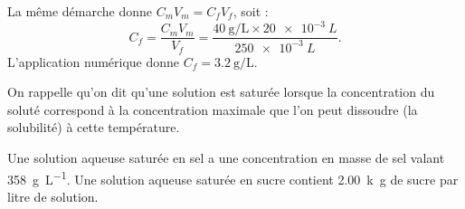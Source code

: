 
\begin{corrige}
La même démarche donne $C_mV_m=C_fV_f$, soit : \vspace{-1mm}
\[
C_f=\frac{C_mV_m}{V_f}=\frac{\SI{40}{\gram\per\liter}\times\SI{20e-3}{L}}{\SI{250e-3}{L}}.
\]
L'application numérique donne $C_f=\SI{3,2}{\gram\per\liter}$.
\end{corrige}


\finEntrainement


\newpage





\bigskip
\begin{prerequis}
On rappelle qu'on dit qu'une solution est saturée lorsque la concentration du soluté correspond à la concentration maximale que l'on peut dissoudre (la solubilité) à cette température. 
\end{prerequis}




\hauteurLargeurCadreReponse		{7mm}{4cm}
\initialisationEntrainement


\debutEntrainement

Une solution aqueuse saturée en sel a une concentration en masse de sel valant \SI{358}{\gram\per\liter}. Une solution aqueuse saturée en sucre contient \SI{2,00}{k\gram} de sucre par litre de solution.


